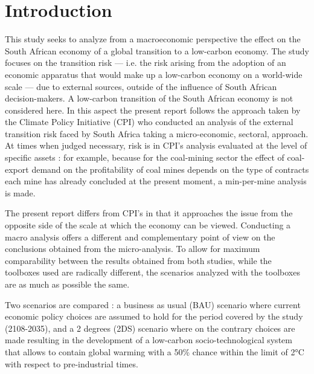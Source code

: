 \documentclass[12pt,english]{article}
\begin{document}
\tableofcontents

\section{Introduction}

This study seeks to analyze from a macroeconomic perspective the effect on the South African economy of a global transition to a low-carbon economy. The study focuses on the transition risk --- i.e. the risk arising from the adoption of an economic apparatus that would make up a low-carbon economy on a world-wide scale --- due to external sources, outside of the influence of South African decision-makers. A low-carbon transition of the South African economy is not considered here. In this aspect the present report follows the approach taken by the Climate Policy Initiative (CPI) who conducted an analysis of the external transition risk faced by South Africa taking a micro-economic, sectoral, approach. At times when judged necessary, risk is in CPI's analysis evaluated at the level of specific assets : for example, because for the coal-mining sector the effect of coal-export demand on the profitability of coal mines depends on the type of contracts each mine has already concluded at the present moment, a min-per-mine analysis is made. 

The present report differs from CPI's in that it approaches the issue from the opposite side of the scale at which the economy can be viewed. Conducting a macro analysis %
offers a different and complementary point of view on the conclusions obtained from the micro-analysis. To allow for maximum comparability between the results obtained from both studies, while the toolboxes used are radically different, the scenarios analyzed with the toolboxes are as much as possible the same. 

Two scenarios are compared : a business as usual (BAU) scenario where current economic policy choices are assumed to hold for the period covered by the study (2108-2035), %
and a 2 degrees (2DS) scenario where on the contrary choices are made resulting in the development of a low-carbon socio-technological system that allows to contain %
global warming with a 50\% chance within the limit of 2°C with respect to pre-industrial times.  
\end{document}
